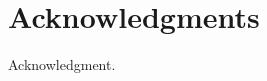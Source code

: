 \documentclass{ecscw2007}
\begin{document}
\section*{Acknowledgments} 

{\footnotesize Acknowledgment. }




  
\end{document}
